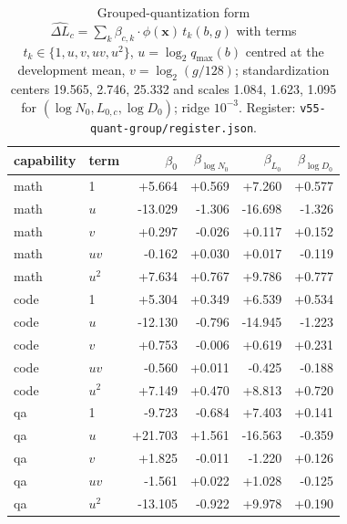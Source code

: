 \begin{table}[H]\centering\footnotesize
\begin{tabular}{@{}llrrrr@{}}
\toprule
capability & term & $\beta_{0}$ & $\beta_{\log N_0}$ & $\beta_{L_0}$ & $\beta_{\log D_0}$ \\
\midrule
math & 1 & +5.664 & +0.569 & +7.260 & +0.577 \\
math & $u$ & -13.029 & -1.306 & -16.698 & -1.326 \\
math & $v$ & +0.297 & -0.026 & +0.117 & +0.152 \\
math & $uv$ & -0.162 & +0.030 & +0.017 & -0.119 \\
math & $u^2$ & +7.634 & +0.767 & +9.786 & +0.777 \\
\midrule
code & 1 & +5.304 & +0.349 & +6.539 & +0.534 \\
code & $u$ & -12.130 & -0.796 & -14.945 & -1.223 \\
code & $v$ & +0.753 & -0.006 & +0.619 & +0.231 \\
code & $uv$ & -0.560 & +0.011 & -0.425 & -0.188 \\
code & $u^2$ & +7.149 & +0.470 & +8.813 & +0.720 \\
\midrule
qa & 1 & -9.723 & -0.684 & +7.403 & +0.141 \\
qa & $u$ & +21.703 & +1.561 & -16.563 & -0.359 \\
qa & $v$ & +1.825 & -0.011 & -1.220 & +0.126 \\
qa & $uv$ & -1.561 & +0.022 & +1.028 & -0.125 \\
qa & $u^2$ & -13.105 & -0.922 & +9.978 & +0.190 \\
\bottomrule\end{tabular}
\caption{Grouped-quantization form $\widehat{\Delta L}_c=\sum_k \beta_{c,k}\cdot\phi(\mathbf x)\,t_k(b,g)$ with terms $t_k\in\{1,u,v,uv,u^2\}$, $u=\log_2 q_{\max}(b)$ centred at the development mean, $v=\log_2(g/128)$; standardization centers 19.565, 2.746, 25.332 and scales 1.084, 1.623, 1.095 for $(\log N_0, L_{0,c}, \log D_0)$; ridge $10^{-3}$. Register: \texttt{v55-quant-group/register.json}.}
\label{tab:quant2d_coef}\end{table}
